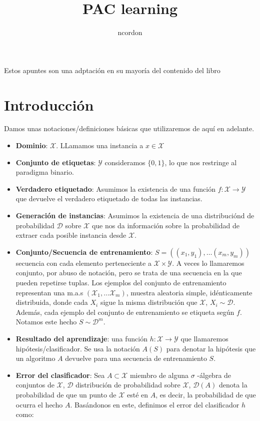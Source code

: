 \documentclass[11pt]{article}
\author{ncordon}
\date{}
\title{PAC learning}
\begin{document}
\maketitle
\tableofcontents

Estos apuntes son una adptación en su mayoría del contenido del libro \cite{shwartz_understanding_ml}

\section{Introducción}
\label{sec-1}
Damos unas notaciones/definiciones básicas que utilizaremos de aquí en adelante.

\begin{itemize}
\item \textbf{Dominio}: $\mathcal{X}$. LLamamos una instancia a $x\in \mathcal{X}$
\item \textbf{Conjunto de etiquetas}: $\mathcal{Y}$ consideramos $\{0,1\}$, lo que nos restringe al paradigma binario.
\item \textbf{Verdadero etiquetado}: Asumimos la existencia de una función $f: \mathcal{X} \rightarrow \mathcal{Y}$ que devuelve el verdadero etiquetado de todas las instancias.
\item \textbf{Generación de instancias}: Asumimos la existencia de una distribuciónd de probabilidad $\mathcal{D}$ sobre $\mathcal{X}$ que nos da información sobre la probabilidad de extraer cada posible instancia desde $\mathcal{X}$.
\item \textbf{Conjunto/Secuencia de entrenamiento}: $S = ((x_1,y_1), \ldots (x_m, y_m))$ secuencia con cada elemento perteneciente a $\mathcal{X}\times \mathcal{Y}$. A veces lo llamaremos conjunto, por abuso de notación, pero se trata de una secuencia en la que pueden repetirse tuplas. Los ejemplos del conjunto de entrenamiento representan una m.a.s $(\mathcal{X}_1,\ldots \mathcal{X}_m)$, muestra aleatoria simple, idénticamente distribuida, donde cada $X_i$ sigue la misma distribución que $\mathcal{X}$, $X_i \sim \mathcal{D}$. Además, cada ejemplo del conjunto de entrenamiento se etiqueta según $f$. Notamos este hecho $S \sim \mathcal{D}^m$.
\item \textbf{Resultado del aprendizaje}: una función $h: \mathcal{X} \rightarrow \mathcal{Y}$ que llamaremos hipótesis/clasificador. Se usa la notación $A(S)$ para denotar la hipótesis que un algoritmo $A$ devuelve para una secuencia de entrenamiento $S$.
\item \textbf{Error del clasificador}: Sea $A \subset \mathcal{X}$ miembro de alguna $\sigma$ -álgebra de conjuntos de $\mathcal{X}$, $\mathcal{D}$ distribución de probabilidad sobre $\mathcal{X}$, $\mathcal{D}(A)$ denota la probabilidad de que un punto de $\mathcal{X}$ esté en $A$, es decir, la probabilidad de que ocurra el hecho $A$. Basándonos en este, definimos el error del clasificador $h$ como:
\end{itemize}
\end{document}
